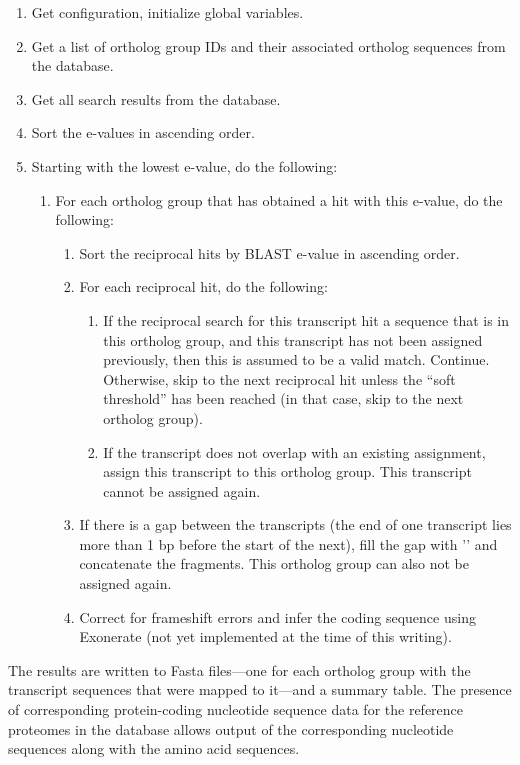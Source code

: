 \begin{enumerate}
	\item Get configuration, initialize global variables.
	\item Get a list of ortholog group IDs and their associated ortholog sequences
		from the database.
	\item Get all search results from the database.
	\item Sort the  e-values in ascending order.
	\item Starting with the lowest  e-value, do the following:
	\begin{enumerate}
		\item For each ortholog group that has obtained a  hit with this
			e-value, do the following:
			\begin{enumerate}
				\item Sort the reciprocal hits by BLAST e-value in ascending order.
				\item For each reciprocal hit, do the following:
				\begin{enumerate}
					\item If the reciprocal search for this transcript hit a sequence that
						is in this ortholog group, and this transcript has not been assigned
						previously, then this is assumed to be a valid match. Continue.
						Otherwise, skip to the next reciprocal hit unless the ``soft
						threshold'' has been reached (in that case, skip to the next
						ortholog group).
					\item If the transcript does not overlap with an existing assignment,
						assign this transcript to this ortholog group. This transcript cannot
						be assigned again. 
				\end{enumerate}
			\item If there is a gap between the transcripts (the end of one transcript
				lies more than 1 bp before the start of the next), fill the gap with
				'' and concatenate the fragments. This ortholog group can also not be
				assigned again.
			\item Correct for frameshift errors and infer the coding sequence using
				Exonerate (not yet implemented at the time of this writing).
		\end{enumerate}
	\end{enumerate}
\end{enumerate}

The results are written to Fasta files---one for each ortholog group with the
transcript sequences that were mapped to it---and a summary table. The presence
of corresponding protein-coding nucleotide sequence data for the reference
proteomes in the database allows output of the corresponding nucleotide
sequences along with the amino acid sequences.





